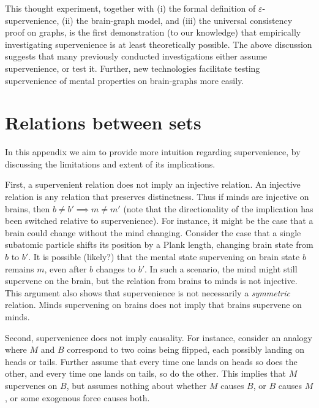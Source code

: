 \documentclass{article}
\begin{document}

This thought experiment, together with (i) the formal definition of $\varepsilon$-supervenience, (ii) the brain-graph model, and (iii) the universal consistency proof on graphs, is the first demonstration (to our knowledge) that empirically investigating supervenience is at least theoretically possible. The above discussion suggests that many previously conducted investigations either assume supervenience, or test it.  Further, new technologies facilitate testing supervenience of mental properties on brain-graphs more easily.


\clearpage
\appendix



\section{Relations between sets} %
\label{sec:relations}

In this appendix we aim to provide more intuition regarding supervenience, by discussing the limitations and extent of its implications. 


First, a supervenient relation does not imply an injective relation.  An injective relation is any relation that preserves distinctness.  Thus if minds are injective on brains, then $b\neq b' \implies m \neq m'$ (note that the directionality of the implication has been switched relative to supervenience). For instance, it might be the case that a brain could change without the mind changing.  Consider the case that a single subatomic particle shifts its position by a Plank length, changing brain state from $b$ to $b'$.  It is possible (likely?) that the mental state supervening on brain state $b$ remains $m$, even after $b$ changes to $b'$.  In such a scenario, the mind might still supervene on the brain, but the relation from brains to minds is not injective. This argument also shows that supervenience is not necessarily a \emph{symmetric} relation.  Minds supervening on brains does not imply that brains supervene on minds.  


Second,  supervenience does not imply causality. %
For instance, consider an analogy where $M$ and $B$ correspond to two coins being flipped, each possibly landing on heads or tails.  Further assume that every time one lands on heads so does the other, and every time one lands on tails, so do the other. This implies that $M$ supervenes on $B$, but assumes nothing about whether $M$ causes $B$, or $B$ causes $M$, or some exogenous force causes both.  
\end{document}
